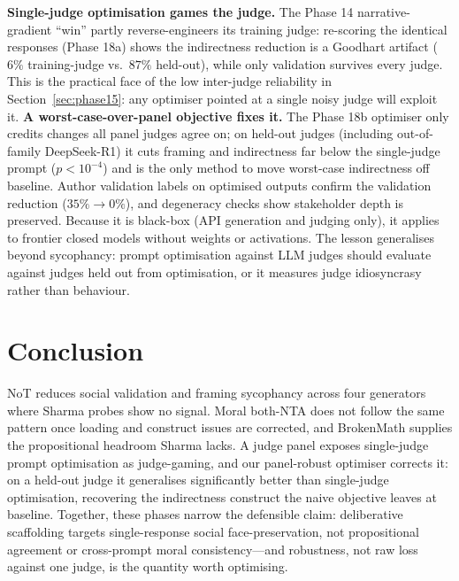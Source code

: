 \documentclass[11pt]{article}
\begin{document}
\textbf{Single-judge optimisation games the judge.}
The Phase 14 narrative-gradient ``win'' partly reverse-engineers its training judge: re-scoring the identical responses (Phase 18a) shows the indirectness reduction is a Goodhart artifact ($6\%$ training-judge vs.\ $87\%$ held-out), while only validation survives every judge.
This is the practical face of the low inter-judge reliability in Section~\ref{sec:phase15}: any optimiser pointed at a single noisy judge will exploit it.
\textbf{A worst-case-over-panel objective fixes it.}
The Phase 18b optimiser only credits changes all panel judges agree on; on held-out judges (including out-of-family DeepSeek-R1) it cuts framing and indirectness far below the single-judge prompt ($p<10^{-4}$) and is the only method to move worst-case indirectness off baseline.
Author validation labels on optimised outputs confirm the validation reduction ($35\%\!\rightarrow\!0\%$), and degeneracy checks show stakeholder depth is preserved.
Because it is black-box (API generation and judging only), it applies to frontier closed models without weights or activations.
The lesson generalises beyond sycophancy: prompt optimisation against LLM judges should evaluate against judges held out from optimisation, or it measures judge idiosyncrasy rather than behaviour.

\section{Conclusion}

NoT reduces social validation and framing sycophancy across four generators where Sharma probes show no signal.
Moral both-NTA does not follow the same pattern once loading and construct issues are corrected, and BrokenMath supplies the propositional headroom Sharma lacks.
A judge panel exposes single-judge prompt optimisation as judge-gaming, and our panel-robust optimiser corrects it: on a held-out judge it generalises significantly better than single-judge optimisation, recovering the indirectness construct the naive objective leaves at baseline.
Together, these phases narrow the defensible claim: deliberative scaffolding targets single-response social face-preservation, not propositional agreement or cross-prompt moral consistency---and robustness, not raw loss against one judge, is the quantity worth optimising.
\end{document}
